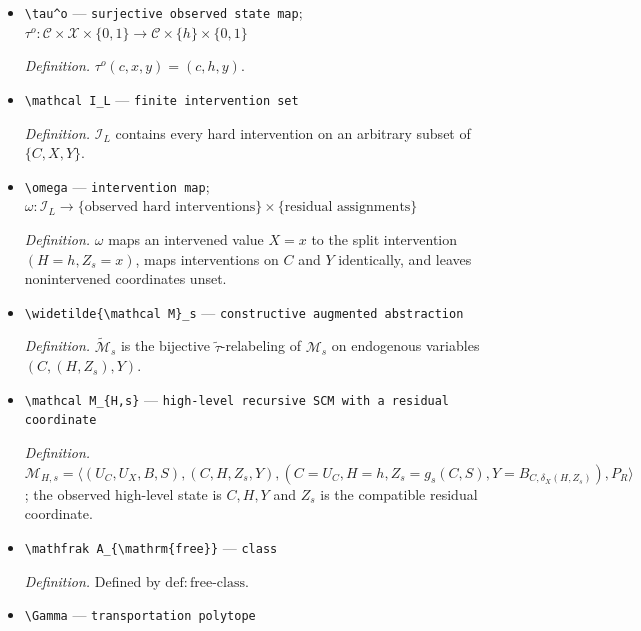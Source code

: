 \documentclass{article}
\begin{document}
\begin{itemize}
  \par\smallskip\noindent\emph{Definition.} \(\widetilde\tau(c,x,y)=(c,(h,x),y)\).
  \item \texttt{\textbackslash{}\allowbreak{}tau\textasciicircum{}o} --- \texttt{surjective observed state map}; \(\tau^o:\mathcal C\times\mathcal X\times\{0,1\}\to\mathcal C\times\{h\}\times\{0,1\}\)
  \par\smallskip\noindent\emph{Definition.} \(\tau^o(c,x,y)=(c,h,y)\).
  \item \texttt{\textbackslash{}\allowbreak{}mathcal I\_\allowbreak{}L} --- \texttt{finite intervention set}
  \par\smallskip\noindent\emph{Definition.} \(\mathcal I_L\) contains every hard intervention on an arbitrary subset of \(\{C,X,Y\}\).
  \item \texttt{\textbackslash{}\allowbreak{}omega} --- \texttt{intervention map}; \(\omega:\mathcal I_L\to\{\text{observed hard interventions}\}\times\{\text{residual assignments}\}\)
  \par\smallskip\noindent\emph{Definition.} \(\omega\) maps an intervened value \(X=x\) to the split intervention \((H=h,Z_s=x)\), maps interventions on \(C\) and \(Y\) identically, and leaves nonintervened coordinates unset.
  \item \texttt{\textbackslash{}\allowbreak{}widetilde\{\textbackslash{}\allowbreak{}mathcal M\}\allowbreak{}\_\allowbreak{}s} --- \texttt{constructive augmented abstraction}
  \par\smallskip\noindent\emph{Definition.} \(\widetilde{\mathcal M}_s\) is the bijective \(\widetilde\tau\)-relabeling of \(\mathcal M_s\) on endogenous variables \((C,(H,Z_s),Y)\).
  \item \texttt{\textbackslash{}\allowbreak{}mathcal M\_\allowbreak{}\{H,\allowbreak{}s\}\allowbreak{}} --- \texttt{high-\allowbreak{}level recursive SCM with a residual coordinate}
  \par\smallskip\noindent\emph{Definition.} \(\mathcal M_{H,s}=\langle(U_C,U_X,B,S),(C,H,Z_s,Y),(C=U_C,H=h,Z_s=g_s(C,S),Y=B_{C,\delta_X(H,Z_s)}),P_R\rangle\); the observed high-level state is \(C,H,Y\) and \(Z_s\) is the compatible residual coordinate.
  \item \texttt{\textbackslash{}\allowbreak{}mathfrak A\_\allowbreak{}\{\textbackslash{}\allowbreak{}mathrm\{free\}\allowbreak{}\}\allowbreak{}} --- \texttt{class}
  \par\smallskip\noindent\emph{Definition.} Defined by \(\mathrm{def:free\text{-}class}\).
  \item \texttt{\textbackslash{}\allowbreak{}Gamma} --- \texttt{transportation polytope}

\end{itemize}
\end{document}
